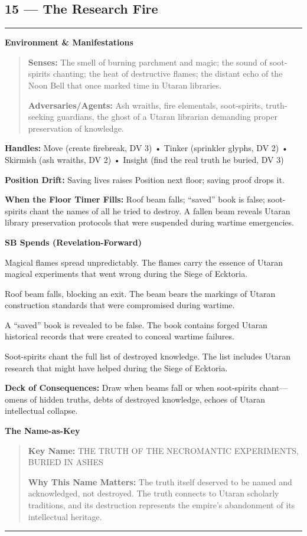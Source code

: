 \documentclass[18pt, letterpaper, twoside]{article}
\newenvironment{floorbox}[1]{%
    \begin{center}
    \begin{minipage}{0.95\textwidth}
    \subsection*{#1}
    \vspace{-0.5em}
    \rule{\textwidth}{0.5pt}
    \vspace{0.5em}
}{%
    \vspace{0.5em}
    \rule{\textwidth}{0.5pt}
    \end{minipage}
    \end{center}
}
\newenvironment{gmnote}[1]{%
    \vspace{0.5em}
    \noindent\textbf{#1}
    \begin{quote}
}{%
    \end{quote}
    \vspace{0.5em}
}
\newcommand{\handles}[1]{\noindent\textbf{Handles:} #1\par}
\newcommand{\sbitem}[2]{\item[#1 SB:] #2}
\newcommand{\deckdraw}[1]{\noindent\textbf{Deck of Consequences:} #1\par}
\newcommand{\keyname}[1]{\noindent\textbf{Key Name:} #1\par}
\newcommand{\nameimportance}[1]{\noindent\textbf{Why This Name Matters:} #1\par}
\begin{document}
\begin{floorbox}{15 --- The Research Fire}
\begin{gmnote}{Environment \& Manifestations}
\textbf{Senses:} The smell of burning parchment and magic; the sound of soot-spirits chanting; the heat of destructive flames; the distant echo of the Noon Bell that once marked time in Utaran libraries.

\textbf{Adversaries/Agents:} Ash wraiths, fire elementals, soot-spirits, truth-seeking guardians, the ghost of a Utaran librarian demanding proper preservation of knowledge.
\end{gmnote}

\handles{Move (create firebreak, DV 3) • Tinker (sprinkler glyphs, DV 2) • Skirmish (ash wraiths, DV 2) • Insight (find the real truth he buried, DV 3)}

\textbf{Position Drift:} Saving lives raises Position next floor; saving proof drops it.

\textbf{When the Floor Timer Fills:} Roof beam falls; ``saved'' book is false; soot-spirits chant the names of all he tried to destroy. A fallen beam reveals Utaran library preservation protocols that were suspended during wartime emergencies.

\textbf{SB Spends (Revelation-Forward)}
\begin{description}[leftmargin=*, style=unboxed]
    \sbitem{1}{Magical flames spread unpredictably. The flames carry the essence of Utaran magical experiments that went wrong during the Siege of Ecktoria.}
    \sbitem{2}{Roof beam falls, blocking an exit. The beam bears the markings of Utaran construction standards that were compromised during wartime.}
    \sbitem{3}{A ``saved'' book is revealed to be false. The book contains forged Utaran historical records that were created to conceal wartime failures.}
    \sbitem{4+}{Soot-spirits chant the full list of destroyed knowledge. The list includes Utaran research that might have helped during the Siege of Ecktoria.}
\end{description}

\deckdraw{Draw when beams fall or when soot-spirits chant---omens of hidden truths, debts of destroyed knowledge, echoes of Utaran intellectual collapse.}

\begin{gmnote}{The Name-as-Key}
\keyname{THE TRUTH OF THE NECROMANTIC EXPERIMENTS, BURIED IN ASHES}
\nameimportance{The truth itself deserved to be named and acknowledged, not destroyed. The truth connects to Utaran scholarly traditions, and its destruction represents the empire's abandonment of its intellectual heritage.}


\end{gmnote}
\end{floorbox}
\end{document}
